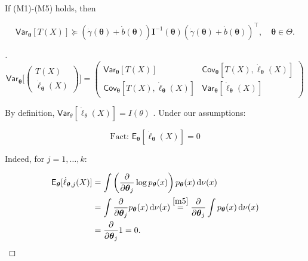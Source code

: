 \begin{theo}
\label{theo:crb}
    
If (M1)-(M5) holds, then

\[
	\mathsf{Var}_{\boldsymbol{\theta}}[T(X)] \succeq \left(\dot{\gamma}(\boldsymbol{\theta}) + \dot{b}(\boldsymbol{\theta})\right) \mathbf{I}^{-1}(\boldsymbol{\theta}) \left(\dot{\gamma}(\boldsymbol{\theta}) + \dot{b}(\boldsymbol{\theta})\right)^{\top}, \quad \boldsymbol{\theta} \in \Theta.
\]

\end{theo}

\begin{proof}[]
    
\[
	\mathsf{Var}_{\boldsymbol{\theta}}\bigg[\begin{pmatrix} T(X) \\ \dot{\ell}_{\boldsymbol{\theta}}(X) \end{pmatrix}\bigg] = \begin{pmatrix} \mathsf{Var}_{\boldsymbol{\theta}}[T(X)] & \mathsf{Cov}_{\boldsymbol{\theta}}[T(X), \dot{\ell}_{\boldsymbol{\theta}}(X)] \\ \mathsf{Cov}_{\boldsymbol{\theta}}[T(X), \dot{\ell}_{\boldsymbol{\theta}}(X)] & \mathsf{Var}_{\boldsymbol{\theta}}[\dot{\ell}_{\boldsymbol{\theta}}(X)] \end{pmatrix}
\]

By definition, \(\mathsf{Var}_{\theta}[\dot{\ell}_{\theta}(X)] = I(\theta)\) .
Under our assumptions:

\begin{equation}
	\label{eq:fact}
	\boxed{\text{Fact: }
	\mathsf{E}_{\boldsymbol{\theta}}[\dot{\ell}_{\boldsymbol{\theta}}(X)] = 0}
\end{equation}

Indeed, for \(j = 1, \ldots, k\):

\[
    \begin{split} \mathsf{E}_{\boldsymbol{\theta}}[\dot{\ell}_{\boldsymbol{\theta},j}(X)] &= \int \left(\frac{\partial}{\partial \boldsymbol{\theta}_{j}} \log p_{\boldsymbol{\theta}}(x)\right) p_{\boldsymbol{\theta}}(x) \, \mathrm{d}\nu(x) \\ &= \int \frac{\partial}{\partial \boldsymbol{\theta}_{j}} p_{\boldsymbol{\theta}}(x) \, \mathrm{d}\nu(x) \stackrel{\ref{m5}}{=} \frac{\partial}{\partial \boldsymbol{\theta}_{j}} \int p_{\boldsymbol{\theta}}(x) \, \mathrm{d}\nu(x) \\ &= \frac{\partial}{\partial \boldsymbol{\theta}_{j}} 1 = 0. \end{split}
\]


\end{proof}
